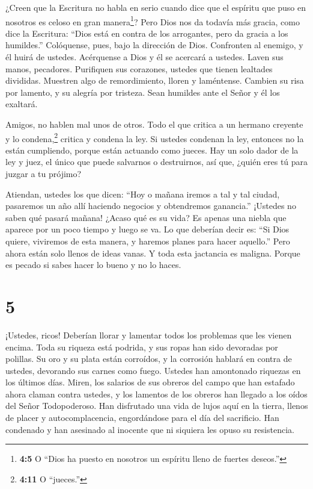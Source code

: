  ¿Creen que la Escritura no habla en serio cuando dice que
el espíritu que puso en nosotros es celoso en gran manera\footnote{\textbf{4:5}
  O ``Dios ha puesto en nosotros un espíritu lleno de fuertes deseos.''}?
 Pero Dios nos da todavía más gracia, como dice la
Escritura: ``Dios está en contra de los arrogantes, pero da gracia a los
humildes.''  Colóquense, pues, bajo la dirección de Dios.
Confronten al enemigo, y él huirá de ustedes.  Acérquense a
Dios y él se acercará a ustedes. Laven sus manos, pecadores. Purifiquen
sus corazones, ustedes que tienen lealtades divididas. 
Muestren algo de remordimiento, lloren y laméntense. Cambien su risa por
lamento, y su alegría por tristeza.  Sean humildes ante el
Señor y él los exaltará.

 Amigos, no hablen mal unos de otros. Todo el que critica a
un hermano creyente y lo condena,\footnote{\textbf{4:11} O ``jueces.''}
critica y condena la ley. Si ustedes condenan la ley, entonces no la
están cumpliendo, porque están actuando como jueces.  Hay
un solo dador de la ley y juez, el único que puede salvarnos o
destruirnos, así que, ¿quién eres tú para juzgar a tu prójimo?

 Atiendan, ustedes los que dicen: ``Hoy o mañana iremos a
tal y tal ciudad, pasaremos un año allí haciendo negocios y obtendremos
ganancia.''  ¡Ustedes no saben qué pasará mañana! ¿Acaso
qué es su vida? Es apenas una niebla que aparece por un poco tiempo y
luego se va.  Lo que deberían decir es: ``Si Dios quiere,
viviremos de esta manera, y haremos planes para hacer aquello.''
 Pero ahora están solo llenos de ideas vanas. Y toda esta
jactancia es maligna.  Porque es pecado si sabes hacer lo
bueno y no lo haces.

\hypertarget{section-4}{%
\section{5}\label{section-4}}

 ¡Ustedes, ricos! Deberían llorar y lamentar todos los
problemas que les vienen encima.  Toda su riqueza está
podrida, y sus ropas han sido devoradas por polillas.  Su
oro y su plata están corroídos, y la corrosión hablará en contra de
ustedes, devorando sus carnes como fuego. Ustedes han amontonado
riquezas en los últimos días.  Miren, los salarios de sus
obreros del campo que han estafado ahora claman contra ustedes, y los
lamentos de los obreros han llegado a los oídos del Señor Todopoderoso.
 Han disfrutado una vida de lujos aquí en la tierra, llenos
de placer y autocomplacencia, engordándose para el día del sacrificio.
 Han condenado y han asesinado al inocente que ni siquiera
les opuso su resistencia.

